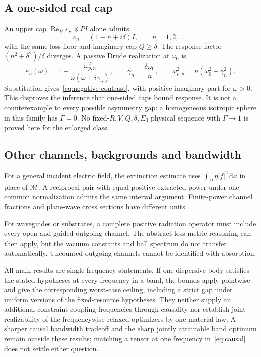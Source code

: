 \documentclass[11pt]{article}
\newcommand{\ReH}{\operatorname{Re}_{\!H}}
\newcommand{\dd}{\,\mathrm{d}}
\newcommand{\abs}[1]{\lvert #1\rvert}
\begin{document}
\subsection{A one-sided real cap}
An upper cap $\ReH\varepsilon_r\preceq PI$ alone admits
\begin{equation}\label{eq:negative-contrast}
 \varepsilon_n=(1-n+i\delta)I,\qquad n=1,2,\ldots,
\end{equation}
with the same loss floor and imaginary cap $Q\geq\delta$. The response factor $(n^2+\delta^2)/\delta$ diverges. A passive Drude realization at $\omega_0$ is
\[
 \varepsilon_n(\omega)=1-\frac{\omega_{p,n}^2}{\omega(\omega+i\gamma_n)},\qquad
 \gamma_n=\frac{\delta\omega_0}{n},\qquad
 \omega_{p,n}^2=n(\omega_0^2+\gamma_n^2).
\]
Substitution gives~\eqref{eq:negative-contrast}, with positive imaginary part for $\omega>0$. This disproves the inference that one-sided caps bound response. It is not a counterexample to every possible asymmetry gap: a homogeneous isotropic sphere in this family has $\Gamma=0$. No fixed-$R,V,Q,\delta,E_0$ physical sequence with $\Gamma\to1$ is proved here for the enlarged class.

\subsection{Other channels, backgrounds and bandwidth}
For a general incident electric field, the extinction estimate uses $\int_D\eta\abs f^2\dd x$ in place of $\mathcal M$. A reciprocal pair with equal positive extracted power under one common normalization admits the same interval argument. Finite-power channel fractions and plane-wave cross sections have different units.

For waveguides or substrates, a complete positive radiation operator must include every open and guided outgoing channel. The abstract loss-metric reasoning can then apply, but the vacuum constants and ball spectrum do not transfer automatically. Uncounted outgoing channels cannot be identified with absorption.

All main results are single-frequency statements. If one dispersive body satisfies the stated hypotheses at every frequency in a band, the bounds apply pointwise and give the corresponding worst-case ceiling, including a strict gap under uniform versions of the fixed-resource hypotheses. They neither supply an additional constraint coupling frequencies through causality nor establish joint realizability of the frequencywise relaxed optimizers by one material law. A sharper causal bandwidth tradeoff and the sharp jointly attainable band optimum remain outside these results; matching a tensor at one frequency in~\eqref{eq:causal} does not settle either question.
\end{document}
